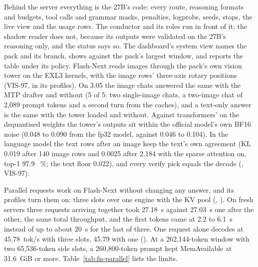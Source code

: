 Behind the server everything is the 27B's code: every route, reasoning formats and budgets, tool calls and grammar masks, penalties, logprobs, seeds, stops, the live view and the usage rows. The conductor and its roles run in front of it; the shadow reader does not, because its outputs were validated on the 27B's reasoning only, and the status says so. The dashboard's system view names the pack and its branch, shows  against the pack's largest window, and reports the table under its policy. Flash-Next reads images through the pack's own vision tower on the EXL3 kernels, with the image rows' three-axis rotary positions (VIS-97,  in its profiles). On 3.05 the image chats answered the same with the MTP drafter and without (5 of 5: two single-image chats, a two-image chat of 2,089 prompt tokens and a second turn from the caches), and a text-only answer is the same with the tower loaded and without. Against transformers'  on the dequantised weights the tower's outputs sit within the official model's own BF16 noise (0.048 to 0.090 from the fp32 model, against 0.046 to 0.104). In the language model the text rows after an image keep the text's own agreement (KL 0.019 after 140 image rows and 0.0025 after 2,184 with the sparse attention on, top-1 97.9 ~\%; the text floor 0.022), and every verify pick equals the decode (, VIS-97).

Parallel requests work on Flash-Next without changing any answer, and its profiles turn them on: three slots over one engine with the KV pool (, ). On fresh servers three requests arriving together took 27.18~s against 27.03~s one after the other, the same total throughput, and the first tokens came at 2.2 to 6.1~s instead of up to about 20~s for the last of three. One request alone decodes at 45.78~tok/s with three slots, 45.79 with one (\measured). At a 262,144-token window with two 65,536-token side slots, a 260,800-token prompt kept MemAvailable at 31.6~GiB or more. Table~\ref{tab:fn-parallel} lists the limits.

